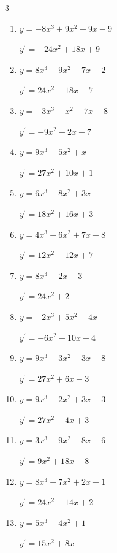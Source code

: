 \begin{multicols}{3}
\begin{enumerate}
  \item $y=-8x^{3}+9x^{2}+9x-9$

        $\displaystyle y^{\prime}=-24x^{2}+18x+9$

  \item $y=8x^{3}-9x^{2}-7x-2$

        $\displaystyle y^{\prime}=24x^{2}-18x-7$

  \item $y=-3x^{3}-x^{2}-7x-8$

        $\displaystyle y^{\prime}=-9x^{2}-2x-7$

  \item $y=9x^{3}+5x^{2}+x$

        $\displaystyle y^{\prime}=27x^{2}+10x+1$

  \item $y=6x^{3}+8x^{2}+3x$

        $\displaystyle y^{\prime}=18x^{2}+16x+3$

  \item $y=4x^{3}-6x^{2}+7x-8$

        $\displaystyle y^{\prime}=12x^{2}-12x+7$

  \item $y=8x^{3}+2x-3$

        $\displaystyle y^{\prime}=24x^{2}+2$

  \item $y=-2x^{3}+5x^{2}+4x$

        $\displaystyle y^{\prime}=-6x^{2}+10x+4$

\columnbreak %

  \item $y=9x^{3}+3x^{2}-3x-8$

        $\displaystyle y^{\prime}=27x^{2}+6x-3$

  \item $y=9x^{3}-2x^{2}+3x-3$

        $\displaystyle y^{\prime}=27x^{2}-4x+3$

  \item $y=3x^{3}+9x^{2}-8x-6$

        $\displaystyle y^{\prime}=9x^{2}+18x-8$

  \item $y=8x^{3}-7x^{2}+2x+1$

        $\displaystyle y^{\prime}=24x^{2}-14x+2$

  \item $y=5x^{3}+4x^{2}+1$

        $\displaystyle y^{\prime}=15x^{2}+8x$


\end{enumerate}
\end{multicols}
